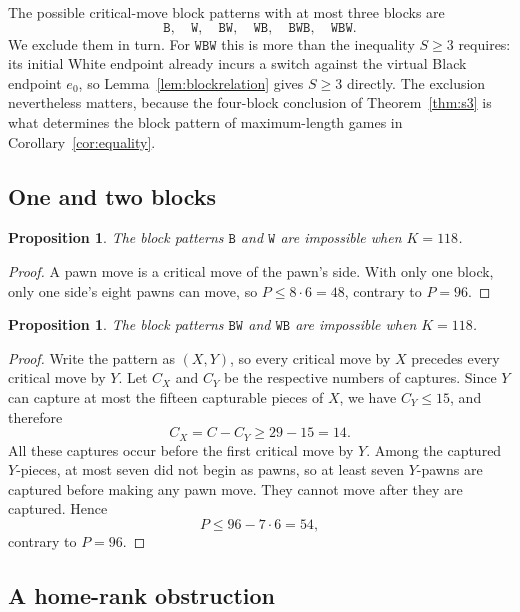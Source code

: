 \documentclass[11pt]{article}
\newtheorem{proposition}[theorem]{Proposition}
\theoremstyle{definition}
\newcommand{\B}{\mathtt{B}}
\newcommand{\W}{\mathtt{W}}
\begin{document}
The possible critical-move block patterns with at most three blocks are
\[
  \B,\quad \W,\quad \B\W,\quad \W\B,\quad
  \B\W\B,\quad \W\B\W.
\]
We exclude them in turn. For $\W\B\W$ this is more than the inequality
$S\ge3$ requires: its initial White endpoint already incurs a switch against
the virtual Black endpoint $e_0$, so Lemma~\ref{lem:blockrelation} gives
$S\ge3$ directly. The exclusion nevertheless matters, because the four-block
conclusion of Theorem~\ref{thm:s3} is what determines the block pattern of
maximum-length games in Corollary~\ref{cor:equality}.

\subsection{One and two blocks}

\begin{proposition}\label{prop:oneblock}
The block patterns $\B$ and $\W$ are impossible when $K=118$.
\end{proposition}

\begin{proof}
A pawn move is a critical move of the pawn's side. With only one block, only
one side's eight pawns can move, so $P\le8\cdot6=48$, contrary to $P=96$.
\end{proof}

\begin{proposition}\label{prop:twoblocks}
The block patterns $\B\W$ and $\W\B$ are impossible when $K=118$.
\end{proposition}

\begin{proof}
Write the pattern as $(X,Y)$, so every critical move by $X$ precedes every
critical move by $Y$. Let $C_X$ and $C_Y$ be the respective numbers of
captures. Since $Y$ can capture at most the fifteen capturable pieces of $X$,
we have $C_Y\le15$, and therefore
\[
  C_X=C-C_Y\ge29-15=14.
\]
All these captures occur before the first critical move by $Y$. Among the
captured $Y$-pieces, at most seven did not begin as pawns, so at least seven
$Y$-pawns are captured before making any pawn move. They cannot move after
they are captured. Hence
\[
  P\le96-7\cdot6=54,
\]
contrary to $P=96$.
\end{proof}

\subsection{A home-rank obstruction}
\end{document}
